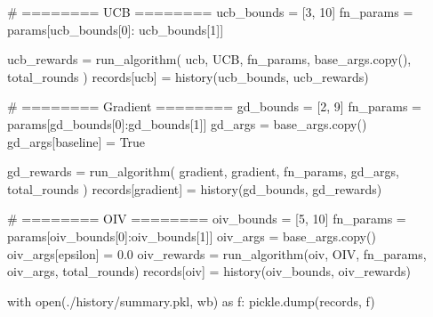 \documentclass[
  letterpaper,
]{krantz}
\makeatletter
\newenvironment{Shaded}{\begin{snugshade}}{\end{snugshade}}
\newcommand{\BuiltInTok}[1]{\textcolor[rgb]{0.00,0.23,0.31}{#1}}
\newcommand{\CommentTok}[1]{\textcolor[rgb]{0.37,0.37,0.37}{#1}}
\newcommand{\ControlFlowTok}[1]{\textcolor[rgb]{0.00,0.23,0.31}{#1}}
\newcommand{\DecValTok}[1]{\textcolor[rgb]{0.68,0.00,0.00}{#1}}
\newcommand{\FloatTok}[1]{\textcolor[rgb]{0.68,0.00,0.00}{#1}}
\newcommand{\ImportTok}[1]{\textcolor[rgb]{0.00,0.46,0.62}{#1}}
\newcommand{\NormalTok}[1]{\textcolor[rgb]{0.00,0.23,0.31}{#1}}
\newcommand{\OperatorTok}[1]{\textcolor[rgb]{0.37,0.37,0.37}{#1}}
\newcommand{\StringTok}[1]{\textcolor[rgb]{0.13,0.47,0.30}{#1}}
\newcommand{\VariableTok}[1]{\textcolor[rgb]{0.07,0.07,0.07}{#1}}
\newenvironment{kframe}{%
\medskip{}
\setlength{\fboxsep}{.8em}
 \def\at@end@of@kframe{}%
 \ifinner\ifhmode%
  \def\at@end@of@kframe{\end{minipage}}%
  \begin{minipage}{\columnwidth}%
 \fi\fi%
 \def\FrameCommand##1{\hskip\@totalleftmargin \hskip-\fboxsep
 \colorbox{shadecolor}{##1}\hskip-\fboxsep
     \hskip-\linewidth \hskip-\@totalleftmargin \hskip\columnwidth}%
 \MakeFramed {\advance\hsize-\width
   \@totalleftmargin\z@ \linewidth\hsize
   \@setminipage}}%
 {\par\unskip\endMakeFramed%
 \at@end@of@kframe}
\renewenvironment{Shaded}{\begin{kframe}}{\end{kframe}}
\theoremstyle{plain}
\theoremstyle{definition}
\theoremstyle{definition}
\theoremstyle{remark}
\makeatother
\begin{document}
\begin{codelisting}
\begin{Shaded}
\begin{Highlighting}[]
    \CommentTok{\# ======== UCB ========}
\NormalTok{    ucb\_bounds }\OperatorTok{=}\NormalTok{ [}\DecValTok{3}\NormalTok{, }\DecValTok{10}\NormalTok{]}
\NormalTok{    fn\_params }\OperatorTok{=}\NormalTok{ params[ucb\_bounds[}\DecValTok{0}\NormalTok{]: ucb\_bounds[}\DecValTok{1}\NormalTok{]]}
    
\NormalTok{    ucb\_rewards }\OperatorTok{=}\NormalTok{ run\_algorithm(}
        \StringTok{\textquotesingle{}ucb\textquotesingle{}}\NormalTok{, UCB, fn\_params, base\_args.copy(), total\_rounds}
\NormalTok{        )}
\NormalTok{    records[}\StringTok{\textquotesingle{}ucb\textquotesingle{}}\NormalTok{] }\OperatorTok{=}\NormalTok{ history(ucb\_bounds, ucb\_rewards)}
    
    \CommentTok{\# ======== Gradient ========}
\NormalTok{    gd\_bounds }\OperatorTok{=}\NormalTok{ [}\DecValTok{2}\NormalTok{, }\DecValTok{9}\NormalTok{]}
\NormalTok{    fn\_params }\OperatorTok{=}\NormalTok{ params[gd\_bounds[}\DecValTok{0}\NormalTok{]:gd\_bounds[}\DecValTok{1}\NormalTok{]]}
\NormalTok{    gd\_args }\OperatorTok{=}\NormalTok{ base\_args.copy()}
\NormalTok{    gd\_args[}\StringTok{\textquotesingle{}baseline\textquotesingle{}}\NormalTok{] }\OperatorTok{=} \VariableTok{True}
    
\NormalTok{    gd\_rewards }\OperatorTok{=}\NormalTok{ run\_algorithm(}
        \StringTok{\textquotesingle{}gradient\textquotesingle{}}\NormalTok{, gradient, fn\_params, gd\_args, total\_rounds}
\NormalTok{        )}
\NormalTok{    records[}\StringTok{\textquotesingle{}gradient\textquotesingle{}}\NormalTok{] }\OperatorTok{=}\NormalTok{ history(gd\_bounds, gd\_rewards)}
    
    \CommentTok{\# ======== OIV ========}
\NormalTok{    oiv\_bounds }\OperatorTok{=}\NormalTok{ [}\DecValTok{5}\NormalTok{, }\DecValTok{10}\NormalTok{]}
\NormalTok{    fn\_params }\OperatorTok{=}\NormalTok{ params[oiv\_bounds[}\DecValTok{0}\NormalTok{]:oiv\_bounds[}\DecValTok{1}\NormalTok{]]}
\NormalTok{    oiv\_args }\OperatorTok{=}\NormalTok{ base\_args.copy()}
\NormalTok{    oiv\_args[}\StringTok{\textquotesingle{}epsilon\textquotesingle{}}\NormalTok{] }\OperatorTok{=} \FloatTok{0.0}
\NormalTok{    oiv\_rewards }\OperatorTok{=}\NormalTok{ run\_algorithm(}\StringTok{\textquotesingle{}oiv\textquotesingle{}}\NormalTok{, OIV, fn\_params, oiv\_args, total\_rounds)}
\NormalTok{    records[}\StringTok{\textquotesingle{}oiv\textquotesingle{}}\NormalTok{] }\OperatorTok{=}\NormalTok{ history(oiv\_bounds, oiv\_rewards)}
    
    \ControlFlowTok{with} \BuiltInTok{open}\NormalTok{(}\StringTok{\textquotesingle{}./history/summary.pkl\textquotesingle{}}\NormalTok{, }\StringTok{\textquotesingle{}wb\textquotesingle{}}\NormalTok{) }\ImportTok{as}\NormalTok{ f:}
\NormalTok{        pickle.dump(records, f)}
\end{Highlighting}
\end{Shaded}

\end{codelisting}
\end{document}
